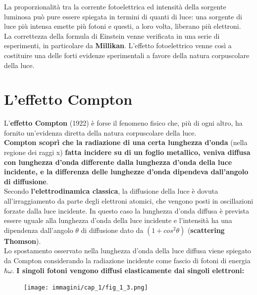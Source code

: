 \documentclass[a4paper,12pt,oneside]{book}
\begin{document}
La proporzionalità tra la corrente fotoelettrica ed intensità della sorgente luminosa può pure essere spiegata in termini di quanti di luce: una sorgente di luce più intensa emette più fotoni e questi, a loro volta, liberano più elettroni.\\

La correttezza della formula di Einstein venne verificata in una serie di esperimenti, in particolare da \textbf{Millikan}. L'effetto fotoelettrico venne così a costituire una delle forti evidenze sperimentali a favore della natura corpuscolare della luce.
\section{L'effetto Compton}
L'\textbf{effetto Compton} (1922) è forse il fenomeno fisico che, più di ogni altro, ha fornito un'evidenza diretta della natura corpuscolare della luce.\\

\textbf{Compton scoprì che la radiazione di una certa lunghezza d'onda} (nella regione dei raggi x) \textbf{fatta incidere su di un foglio metallico, veniva diffusa con lunghezza d'onda differente dalla lunghezza d'onda della luce incidente, e la differenza delle lunghezze d'onda dipendeva dall'angolo di diffusione}.\\

Secondo \textbf{l'elettrodinamica classica}, la diffusione della luce è dovuta all'irraggiamento da parte degli elettroni atomici, che vengono posti in oscillazioni forzate dalla luce incidente. In questo caso la lunghezza d'onda diffusa è prevista essere uguale alla lunghezza d'onda della luce incidente e l'intensità ha una dipendenza dall'angolo $\theta$ di diffusione dato da $(1+cos^2 \theta)$ (\textbf{scattering Thomson}).\\

Lo spostamento osservato nella lunghezza d'onda della luce diffusa viene spiegato da Compton considerando la radiazione incidente come fascio di fotoni di energia $\hbar \omega$. \textbf{I singoli fotoni vengono diffusi elasticamente dai singoli elettroni:}
	\begin{figure}[!htbp]
		\begin{center}
			\texttt{[image: immagini/cap\_1/fig\_1\_3.png]}
		\end{center}
	\end{figure}
	
\end{document}
